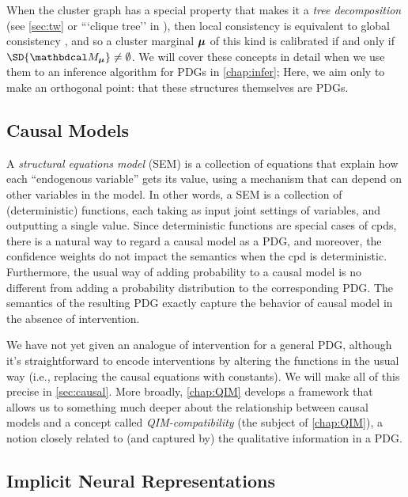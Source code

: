 When the cluster graph has a special property that makes it a \emph{tree decomposition} 
    (see \cref{sec:tw} or ```clique tree'' in \citep{KF09}),
then local consistency is equivalent to global consistency \citep{wainwright2008graphical},
and so a cluster marginal $\boldsymbol\mu$ of this kind is calibrated if and only if $\SD{\dg M_{\bmu}} \ne \emptyset$.
We will cover these concepts in detail when we
    use them to an inference algorithm for PDGs in \cref{chap:infer};
Here, we aim only to make an orthogonal point: that these structures themselves are PDGs. 

\subsection{Causal Models}
    \label{ssec:capture-causal-models}
    
A \emph{structural equations model} (SEM) \citep{pearl2009causality} is a collection of equations that explain how each ``endogenous variable'' gets its value, using a mechanism that can depend on other variables in the model.
In other words, a SEM is a collection of (deterministic) functions, each taking as input joint settings of variables, and outputting a single value.
Since deterministic functions are special cases of cpds, there is a natural way to regard a causal model as a PDG, and moreover, the confidence weights do not impact the semantics when the cpd is deterministic.  
Furthermore, the usual way of adding probability to a causal model is no different from adding a probability distribution to the corresponding PDG. 
The semantics of the resulting PDG exactly capture the behavior of causal model in the absence of intervention.

We have not yet given an analogue of intervention for a general PDG, although it's straightforward to encode interventions by altering the functions in the usual way (i.e., replacing the causal equations with constants).
We will make all of this precise in \cref{sec:causal}.
More broadly, \cref{chap:QIM} develops a framework that allows us to something much deeper about the relationship between causal models and a concept called \emph{QIM-compatibility} (the subject of \cref{chap:QIM}), a notion closely related to (and captured by) the qualitative information in a PDG. 

\subsection{Implicit Neural Representations}
    \label{ssec:implicit-neural-repr}

